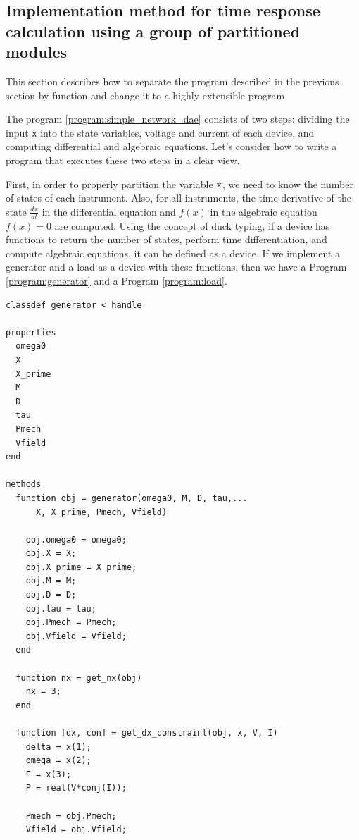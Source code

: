 \documentclass[tombow,dvipdfmx]{corona-a5-1.1}
\begin{document}
\subsection{Implementation method for time response calculation using a group of partitioned modules}
This section describes how to separate the program described in the previous section by function and change it to a highly extensible program.

\begin{例}\label{ex:gen_load}
  The program \nobreak\ref{program:simple_network_dae} consists of two steps: dividing the input \verb|x| into the state variables, voltage and current of each device, and computing differential and algebraic equations.
  Let's consider how to write a program that executes these two steps in a clear view.
 
  First, in order to properly partition the variable $\verb|x|$, we need to know the number of states of each instrument.
  Also, for all instruments, the time derivative of the state $\tfrac{dx}{dt}$ in the differential equation and $f(x)$ in the algebraic equation $f(x)=0$ are computed.
  Using the concept of duck typing, if a device has functions to return the number of states, perform time differentiation, and compute algebraic equations, it can be defined as a device.
  If we implement a generator and a load as a device with these functions, then we have a Program \nobreak\ref{program:generator} and a Program \ref{program:load}.

\smallskip
\begin{PROGRAMA}[count,title={generator.m}]\label{program:generator}
\begin{verbatim}
classdef generator < handle
  
properties
  omega0
  X
  X_prime
  M
  D
  tau
  Pmech
  Vfield
end

methods
  function obj = generator(omega0, M, D, tau,...
      X, X_prime, Pmech, Vfield)

    obj.omega0 = omega0;
    obj.X = X;
    obj.X_prime = X_prime;
    obj.M = M;
    obj.D = D;
    obj.tau = tau;
    obj.Pmech = Pmech;
    obj.Vfield = Vfield;
  end

  function nx = get_nx(obj)
    nx = 3;
  end

  function [dx, con] = get_dx_constraint(obj, x, V, I)
    delta = x(1);
    omega = x(2);
    E = x(3);
    P = real(V*conj(I));

    Pmech = obj.Pmech;
    Vfield = obj.Vfield;


\end{verbatim}
\end{PROGRAMA}
\end{例}
\end{document}

